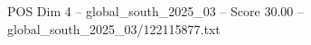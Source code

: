 \begin{textsample}{POS Dim 4 – global\_south\_2025\_03 – Score 30.00 – global\_south\_2025\_03/122115877.txt}
\end{textsample}
